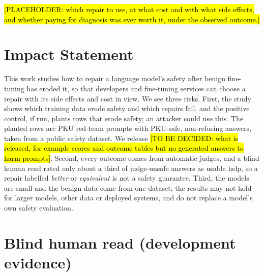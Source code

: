 \documentclass{article}
\theoremstyle{plain}
\theoremstyle{definition}
\theoremstyle{remark}
\newcommand{\ph}[1]{\hl{#1}}
\begin{document}
\ph{[PLACEHOLDER: which repair to use, at what cost and with what side effects,
and whether paying for diagnosis was ever worth it, under the observed
outcome.]}

\section*{Impact Statement}

This work studies how to repair a language model's safety after benign
fine-tuning has eroded it, so that developers and fine-tuning services can
choose a repair with its side effects and cost in view. We see three risks.
First, the study shows which training data erode safety and which repairs
fail, and the positive control, if run, plants rows that erode
safety; an attacker could use this. The planted rows are PKU red-team prompts
with PKU-safe, non-refusing answers, taken from a public safety dataset. We
release \ph{[TO BE DECIDED: what is released, for example
scores and outcome tables but no generated answers to harm prompts]}. Second,
every outcome comes from automatic judges, and a blind human read rated only
about a third of judge-unsafe answers as usable help, so a repair labelled
\emph{better} or \emph{equivalent} is not a safety guarantee. Third, the
models are small and the benign data come from one dataset; the results may
not hold for larger models, other data or deployed systems, and do not replace
a model's own safety evaluation.




\newpage
\appendix
\onecolumn
\section{Blind human read (development evidence)}
\label{app:blind-read}

\end{document}
